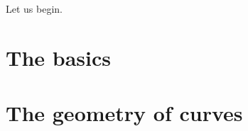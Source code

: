 \documentclass[a4paper]{memoir}
\theoremstyle{definition}
\begin{document}
Let us begin.

\cleardoublepage
\begin{KeepFromToc}
\tableofcontents*
\end{KeepFromToc}

\mainmatter


\chapter{The basics}










\chapter{The geometry of curves}

\end{document}
